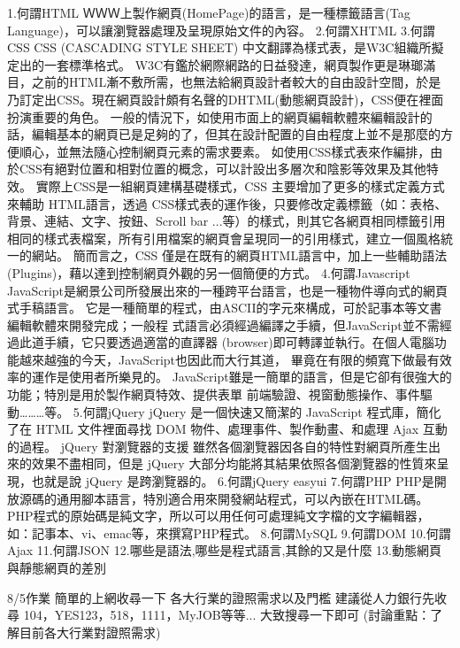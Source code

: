 1.何謂HTML
ＷＷＷ上製作網頁(HomePage)的語言，是一種標籤語言(Tag Language)，可以讓瀏覽器處理及呈現原始文件的內容。
2.何謂XHTML
3.何謂CSS
CSS (CASCADING STYLE SHEET) 中文翻譯為樣式表，是W3C組織所擬定出的一套標準格式。
W3C有鑑於網際網路的日益發達，網頁製作更是琳瑯滿目，之前的HTML漸不敷所需，也無法給網頁設計者較大的自由設計空間，於是乃訂定出CSS。現在網頁設計頗有名聲的DHTML(動態網頁設計)，CSS便在裡面扮演重要的角色。
一般的情況下，如使用市面上的網頁編輯軟體來編輯設計的話，編輯基本的網頁已是足夠的了，但其在設計配置的自由程度上並不是那麼的方便順心，並無法隨心控制網頁元素的需求要素。
如使用CSS樣式表來作編排，由於CSS有絕對位置和相對位置的概念，可以計設出多層次和陰影等效果及其他特效。 
實際上CSS是一組網頁建構基礎樣式，CSS 主要增加了更多的樣式定義方式來輔助 HTML語言，透過 CSS樣式表的運作後，只要修改定義標籤（如：表格、背景、連結、文字、按鈕、Scroll bar ...等）的樣式，則其它各網頁相同標籤引用相同的樣式表檔案，所有引用檔案的網頁會呈現同一的引用樣式，建立一個風格統一的網站。
簡而言之，CSS 僅是在既有的網頁HTML語言中，加上一些輔助語法(Plugins)，藉以達到控制網頁外觀的另一個簡便的方式。
4.何謂Javascript
JavaScript是網景公司所發展出來的一種跨平台語言，也是一種物件導向式的網頁式手稿語言。 
它是一種簡單的程式，由ASCII的字元來構成，可於記事本等文書編輯軟體來開發完成；一般程 式語言必須經過編譯之手續，但JavaScript並不需經過此道手續，它只要透過適當的直譯器 (browser)即可轉譯並執行。在個人電腦功能越來越強的今天，JavaScript也因此而大行其道， 畢竟在有限的頻寬下做最有效率的運作是使用者所樂見的。 
JavaScript雖是一簡單的語言，但是它卻有很強大的功能；特別是用於製作網頁特效、提供表單 前端驗證、視窗動態操作、事件驅動………等。 
5.何謂jQuery
jQuery 是一個快速又簡潔的 JavaScript 程式庫，簡化了在 HTML 文件裡面尋找 DOM 物件、處理事件、製作動畫、和處理 Ajax 互動的過程。
jQuery 對瀏覽器的支援
雖然各個瀏覽器因各自的特性對網頁所產生出來的效果不盡相同，但是 jQuery 大部分均能將其結果依照各個瀏覽器的性質來呈現，也就是說 jQuery 是跨瀏覽器的。
6.何謂jQuery easyui
7.何謂PHP
PHP是開放源碼的通用腳本語言，特別適合用來開發網站程式，可以內嵌在HTML碼。
PHP程式的原始碼是純文字，所以可以用任何可處理純文字檔的文字編輯器，
如：記事本、vi、emac等，來撰寫PHP程式。
8.何謂MySQL
9.何謂DOM
10.何謂Ajax
11.何謂JSON
12.哪些是語法,哪些是程式語言,其餘的又是什麼
13.動態網頁與靜態網頁的差別

8/5作業
簡單的上網收尋一下
各大行業的證照需求以及門檻
建議從人力銀行先收尋
104，YES123，518，1111，MyJOB等等...
大致搜尋一下即可
(討論重點：了解目前各大行業對證照需求)

